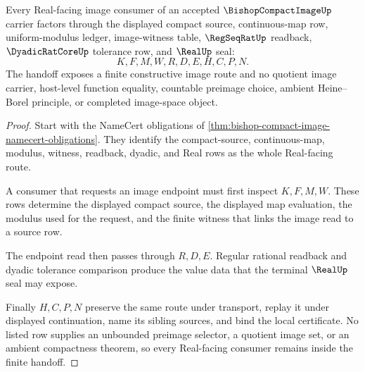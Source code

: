 \begin{theorem}
\label{thm:bishop-compact-image-real-completion-handoff}
Every Real-facing image consumer of an accepted $\BishopCompactImageUp$ carrier factors through the displayed compact source, continuous-map row, uniform-modulus ledger, image-witness table, $\RegSeqRatUp$ readback, $\DyadicRatCoreUp$ tolerance row, and $\RealUp$ seal:
$$
K,F,M,W,R,D,E,H,C,P,N .
$$
The handoff exposes a finite constructive image route and no quotient image carrier, host-level function equality, countable preimage choice, ambient Heine--Borel principle, or completed image-space object.
\end{theorem}
\begin{proof}
Start with the NameCert obligations of \autoref{thm:bishop-compact-image-namecert-obligations}. They identify the compact-source, continuous-map, modulus, witness, readback, dyadic, and Real rows as the whole Real-facing route.

A consumer that requests an image endpoint must first inspect $K,F,M,W$. These rows determine the displayed compact source, the displayed map evaluation, the modulus used for the request, and the finite witness that links the image read to a source row.

The endpoint read then passes through $R,D,E$. Regular rational readback and dyadic tolerance comparison produce the value data that the terminal $\RealUp$ seal may expose.

Finally $H,C,P,N$ preserve the same route under transport, replay it under displayed continuation, name its sibling sources, and bind the local certificate. No listed row supplies an unbounded preimage selector, a quotient image set, or an ambient compactness theorem, so every Real-facing consumer remains inside the finite handoff.
\end{proof}


\begin{closurestatus}{\BishopCompactImageUp}
  \theoryclosure{\seedClosure}
  \formalstatus{\unformalizedV}
\end{closurestatus}
